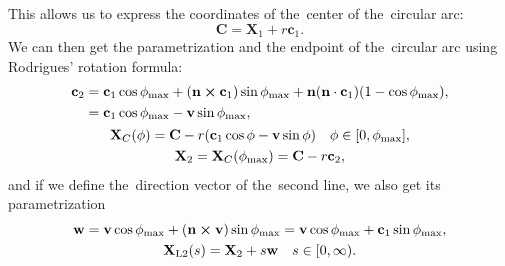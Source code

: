 			This allows us to express the coordinates of the~center of the~circular arc:
				\begin{equation}
					\mathbf{C} = \mathbf{X}_1+r\mathbf{c}_1.
				\end{equation}
			We can then get the parametrization and the endpoint of the~circular arc using Rodrigues' rotation formula:
				\begin{gather}
					\begin{aligned}
						\mathbf{c}_2 &= \mathbf{c}_1\cos\phi_\text{max} + (\mathbf{n}\cross\mathbf{c}_1)\sin\phi_\text{max} + \mathbf{n}(\mathbf{n}\cdot\mathbf{c}_1)(1-\cos\phi_\text{max}),\\
						&= \mathbf{c}_1\cos\phi_\text{max} - \mathbf{v}\sin\phi_\text{max},
					\end{aligned}\\
					\mathbf{X}_C(\phi) = \mathbf{C} - r(\mathbf{c}_1\cos\phi - \mathbf{v}\sin\phi) \quad \phi\in[0,\phi_\text{max}],\\
					\mathbf{X}_2 = \mathbf{X}_C(\phi_\text{max}) = \mathbf{C} - r\mathbf{c}_2,
				\end{gather}
			and if we define the~direction vector of the~second line, we also get its parametrization
				\begin{gather}
					\mathbf{w} = \mathbf{v}\cos\phi_\text{max} + (\mathbf{n}\cross\mathbf{v})\sin\phi_\text{max} = \mathbf{v}\cos\phi_\text{max} + \mathbf{c}_1\sin\phi_\text{max},\\
					\mathbf{X}_\text{L2}(s) = \mathbf{X}_2 + s\mathbf{w} \quad s\in[0,\infty).
				\end{gather}
				
